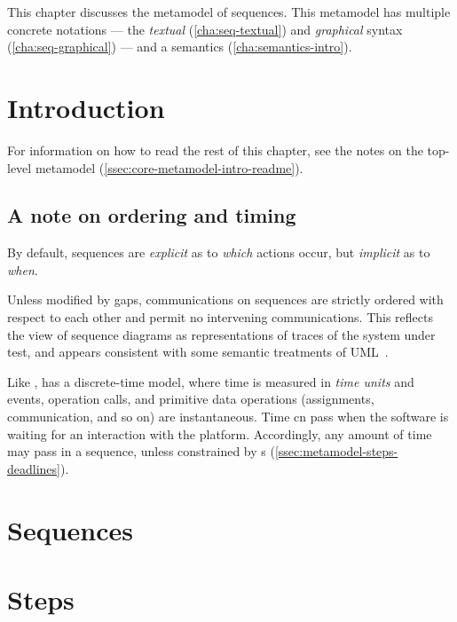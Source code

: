 

This chapter discusses the metamodel of \langname{} sequences.  This metamodel
has multiple concrete notations ---
the \emph{textual} (\cref{cha:seq-textual}) and \emph{graphical}
syntax (\cref{cha:seq-graphical}) --- and a semantics (\cref{cha:semantics-intro}). 

\section{Introduction}\label{sec:metamodel-intro}

For information on how to read the rest of this chapter, see the notes on
the top-level metamodel (\cref{ssec:core-metamodel-intro-readme}).

\subsection{A note on ordering and timing}\label{ssec:metamodel-intro-ordering}

By default, \langname{} sequences are \emph{explicit}
as to \emph{which} actions occur, but \emph{implicit} as to
\emph{when}.

Unless modified by gaps,
communications on \langname{} sequences are strictly ordered with
respect to each other and permit no intervening communications.  This
reflects the view of sequence diagrams as representations of traces of
the system under test, and appears consistent with some semantic
treatments of UML~\cite{lima-semantics}.  

Like \robochart, \langname{} has a discrete-time model, where time is
measured in \emph{time units} and events, operation calls, and
primitive data operations (assignments, communication, and so on) are
instantaneous.  Time cn pass when the software is waiting for an
interaction with the platform.  Accordingly, any amount of time may
pass in a sequence, unless constrained by \mdeadlinestep s
(\cref{ssec:metamodel-steps-deadlines}).

\section{Sequences}\label{sec:metamodel-sequences}


\section{Steps}\label{sec:metamodel-steps}


